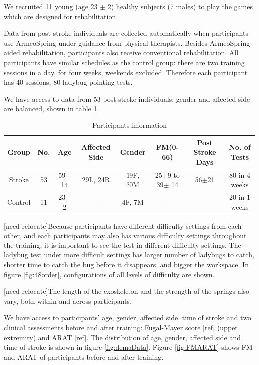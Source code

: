We recruited 11 young (age 23 $\pm$ 2) healthy subjects (7 males) to play the games which are designed for rehabilitation.

Data from post-stroke individuals are collected automatically when participants use ArmeoSpring under guidance from physical therapists. 
Besides ArmeoSpring-aided rehabilitation, participants also receive conventional rehabilitation.
All participants have similar schedules as the control group: there are two training sessions in a day, for four weeks, weekends excluded. Therefore each participant has 40 sessions, 80 ladybug pointing tests.

We have access to data from 53 post-stroke individuals; gender and affected side are balanced, shown in table \ref{tab:demog}. 

\begin{table}[b]
	\begin{tabular}{c c c c c c c c}
	\hline
	Group & No. & Age & Affected Side & Gender & FM(0-66) & Post Stroke Days & No. of Tests\\
	\hline
	Stroke & 53 & 59$\pm$14 & 29L, 24R & 19F, 30M & 25$\pm$9 to 39$\pm$ 14 & 56$\pm$21 & 80 in 4 weeks \\ 
	Control & 11 & 23$\pm$2 & - & 4F, 7M & - & - & 20 in 1 weeks \\
	\hline
	\end{tabular}
	\caption{Participants information}
	\label{tab:demog}
\end{table}


[need relocate]Because participants have different difficulty settings from each other, and each participants may also has various difficulty settings throughout the training, it is important to see the test in different difficulty settings. 
The ladybug test under more difficult settings has larger number of ladybugs to catch, shorter time to catch the bug before it disappears, and bigger the workspace. 
In figure \ref{fig:48order}, configurations of all levels of difficulty are shown. 

[need relocate]The length of the exoskeleton and the strength of the springs also vary, both within and across participants.

We have access to participants' age, gender, affected side, time of stroke and two clinical assessments before and after training: Fugal-Mayer score [ref] (upper extremity) and ARAT [ref]. The distribution of age, gender, affected side and time of stroke is shown in figure \ref{fig:demoData}. Figure \ref{fig:FMARAT} shows FM and ARAT of participants before and after training.

